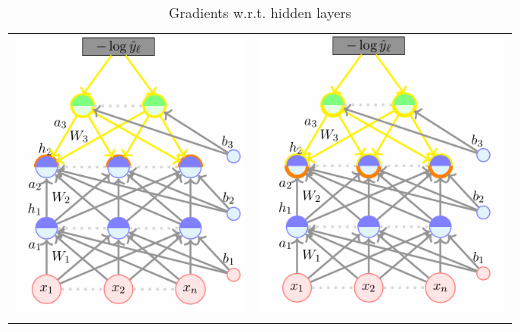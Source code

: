 \documentclass[11pt, a4paper]{article}
\begin{document}
\begin{table}
\begin{center}
\begin{tabular}{cc}
\centering
\includegraphics[scale = 0.5]{image_10.png}
&
\centering
\includegraphics[scale = 0.5]{image_11.png}

\end{tabular}
\caption{Gradients w.r.t. hidden layers}
\label{tab:1}
\end{center}
\end{table}
\end{document}
